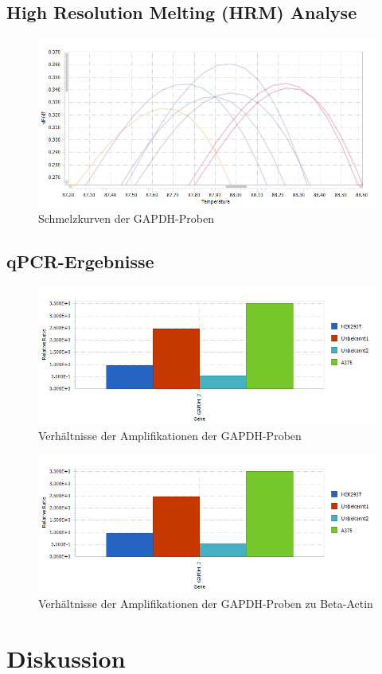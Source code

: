 \documentclass{article}
\begin{document}
\subsection*{High Resolution Melting (HRM) Analyse}
\begin{figure}[H]
    \centering
    \includegraphics[width=\textwidth]{images/cycler/mc2.png}
    \caption{Schmelzkurven der GAPDH-Proben}
    \label{fig:gapdh}
\end{figure}
\subsection*{qPCR-Ergebnisse}
\begin{figure}[H]
    \centering
    \includegraphics[width=\textwidth]{images/cycler/G1_2_G2.png}
    \caption{Verhältnisse der Amplifikationen der GAPDH-Proben}
    \label{fig:gapdh}
\end{figure}
\begin{figure}[H]
    \centering
    \includegraphics[width=\textwidth]{images/cycler/G1_2_G2.png}
    \caption{Verhältnisse der Amplifikationen der GAPDH-Proben zu Beta-Actin}
    \label{fig:gapdh2beta}
\end{figure}
\section{Diskussion}





\end{document}
